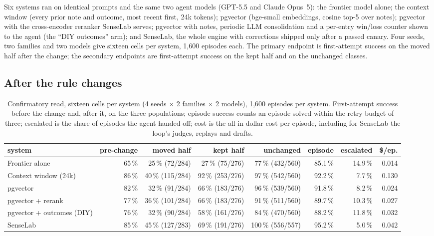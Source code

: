 \documentclass[11pt]{article}
\begin{document}
Six systems ran on identical prompts and the same two agent models (GPT-5.5 and Claude Opus~5):
the frontier model alone; the context window (every prior note and outcome, most recent first,
24k tokens); pgvector (bge-small embeddings, cosine top-5 over notes); pgvector with the
cross-encoder reranker SenseLab serves; pgvector with notes, periodic LLM consolidation and a
per-entry win/loss counter shown to the agent (the ``DIY outcomes'' arm); and SenseLab, the
whole engine with corrections shipped only after a passed canary. Four seeds, two families and
two models give sixteen cells per system, 1,600 episodes each. The primary endpoint is
first-attempt success on the moved half after the change; the secondary endpoints are
first-attempt success on the kept half and on the unchanged classes.

\subsection{After the rule changes}

\begin{table}[t]
\centering\footnotesize
\caption{Confirmatory read, sixteen cells per system (4 seeds $\times$ 2 families $\times$ 2
models), 1,600 episodes per system. First-attempt success before the change and, after it, on
the three populations; episode success counts an episode solved within the retry budget of
three; escalated is the share of episodes the agent handed off; cost is the all-in dollar cost
per episode, including for SenseLab the loop's judges, replays and drafts.}
\label{tab:headline}
\setlength{\tabcolsep}{2.6pt}
\begin{tabular}{@{}lrrrrrrr@{}}
\toprule
system & pre-change & moved half & kept half & unchanged & episode & escalated & \$/ep.\\
\midrule
Frontier alone            & 65\,\% & 25\,\% (72/284)  & 27\,\% (75/276)  & 77\,\% (432/560)  & 85.1\,\% & 14.9\,\% & 0.014\\
Context window (24k)      & 86\,\% & 40\,\% (115/284) & 92\,\% (253/276) & 97\,\% (542/560)  & 92.2\,\% &  7.7\,\% & 0.130\\
pgvector                  & 82\,\% & 32\,\% (91/284)  & 66\,\% (183/276) & 96\,\% (539/560)  & 91.8\,\% &  8.2\,\% & 0.024\\
pgvector + rerank         & 77\,\% & 36\,\% (101/284) & 66\,\% (183/276) & 91\,\% (511/560)  & 89.7\,\% & 10.3\,\% & 0.027\\
pgvector + outcomes (DIY) & 76\,\% & 32\,\% (90/284)  & 58\,\% (161/276) & 84\,\% (470/560)  & 88.2\,\% & 11.8\,\% & 0.032\\
SenseLab                  & 85\,\% & 45\,\% (127/283) & 69\,\% (191/276) & 100\,\% (556/557) & 95.2\,\% &  5.0\,\% & 0.042\\
\bottomrule
\end{tabular}
\end{table}
\end{document}
